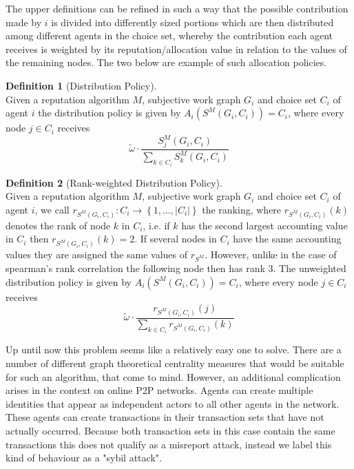 \documentclass[11pt,a4paper]{report}
\theoremstyle{definition}
\newtheorem{definition}{Definition}[section]
\theoremstyle{theorem}
\theoremstyle{proposition}
\theoremstyle{corollary}
\theoremstyle{lemma}
\theoremstyle{example}
\theoremstyle{remark}
\begin{document}
\noindent{}The upper definitions can be refined in such a way that the possible contribution made by $i$ is divided into differently sized portions which are then distributed among different agents in the choice set, whereby the contribution each agent receives is weighted by its reputation/allocation value in relation to the values of the remaining nodes. The two below are example of such allocation policies.\vspace{1em}\\

\begin{definition}[Distribution Policy]\ \\
Given a reputation algorithm $M$, subjective work graph $G_i$ and choice set $C_i$ of agent $i$ the distribution policy is given by $A_i(S^M(G_i,C_i))=C_i$, where every node $j\in{}C_i$ receives 
\[
\tilde{\omega}\cdot\frac{S^M_j(G_i,C_i)}{\sum\limits_{k\in{}C_i}S^M_k(G_i,C_i)}
\]
\end{definition}

\begin{definition}[Rank-weighted Distribution Policy]\ \\
Given a reputation algorithm $M$, subjective work graph $G_i$ and choice set $C_i$ of agent $i$, we call $r_{S^M(G_i,C_i)}:C_i\rightarrow\left\lbrace{}1,\ldots,|C_i|\right\rbrace$ the ranking, where $r_{S^M(G_i,C_i)}(k)$ denotes the rank of node $k$ in $C_i$, i.e. if $k$ has the second largest accounting value in $C_i$ then $r_{S^M(G_i,C_i)}(k)=2$. If several nodes in $C_i$ have the same accounting values they are assigned the same values of $r_{S^M}$. However, unlike in the case of spearman's rank correlation the following node then has rank 3. The unweighted distribution policy is given by $A_i(S^M(G_i,C_i))=C_i$, where every node $j\in{}C_i$ receives
\[
\tilde{\omega}\cdot\frac{r_{S^M(G_i,C_i)}(j)}{\sum\limits_{k\in{}C_i}r_{S^M(G_i,C_i)}(k)}
\]
\end{definition}

\noindent{}Up until now this problem seems like a relatively easy one to solve. There are a number of different graph theoretical centrality measures that would be suitable for such an algorithm, that come to mind. However, an additional complication arises in the context on online P2P networks. Agents can create multiple identities that appear as independent actors to all other agents in the network. These agents can create transactions in their transaction sets that have not actually occurred. Because both transaction sets in this case contain the same transactions this does not qualify as a misreport attack, instead we label this kind of behaviour as a "sybil attack".
\end{document}
